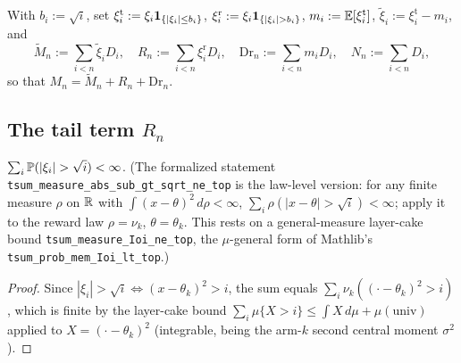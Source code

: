 \begin{definition}\label{def:lil_trunc}
With $b_i:=\sqrt i$, set
$\xi_i^{\mathrm t}:=\xi_i\mathbf{1}_{\{|\xi_i|\le b_i\}}$,
$\xi_i^{\mathrm r}:=\xi_i\indic_{\{|\xi_i|> b_i\}}$,
$m_i:=\mathbb{E}[\xi_i^{\mathrm t}]$, $\tilde\xi_i:=\xi_i^{\mathrm t}-m_i$, and
\[
  \tilde M_n:=\sum_{i<n}\tilde\xi_i D_i,\quad
  R_n:=\sum_{i<n}\xi_i^{\mathrm r} D_i,\quad
  \mathrm{Dr}_n:=\sum_{i<n} m_i D_i,\quad
  N_n:=\sum_{i<n} D_i,
\]
so that $M_n=\tilde M_n+R_n+\mathrm{Dr}_n$.
\end{definition}

\subsection{The tail term $R_n$}

\begin{lemma}\label{lem:trunc_tail_summable}
\leanok
{}
$\sum_{i}\Prob(|\xi_i|>\sqrt i)<\infty$. (The formalized statement
\texttt{tsum\_measure\_abs\_sub\_gt\_sqrt\_ne\_top} is the law-level version: for any finite measure
$\rho$ on $\mathbb{R}$ with $\int(x-\theta)^2\,d\rho<\infty$, $\sum_i\rho(|x-\theta|>\sqrt i)<\infty$; apply
it to the reward law $\rho=\nu_k$, $\theta=\theta_k$. This rests on a general-measure layer-cake
bound \texttt{tsum\_measure\_Ioi\_ne\_top}, the $\mu$-general form of Mathlib's
\texttt{tsum\_prob\_mem\_Ioi\_lt\_top}.)
\end{lemma}
\begin{proof}\leanok
Since $|\xi_i|>\sqrt i \iff (x-\theta_k)^2>i$, the sum equals $\sum_i\nu_k((\cdot-\theta_k)^2>i)$,
which is finite by the layer-cake bound $\sum_i\mu\{X>i\}\le\int X\,d\mu+\mu(\text{univ})$ applied to
$X=(\cdot-\theta_k)^2$ (integrable, being the arm-$k$ second central moment $\sigma^2$).
\end{proof}

